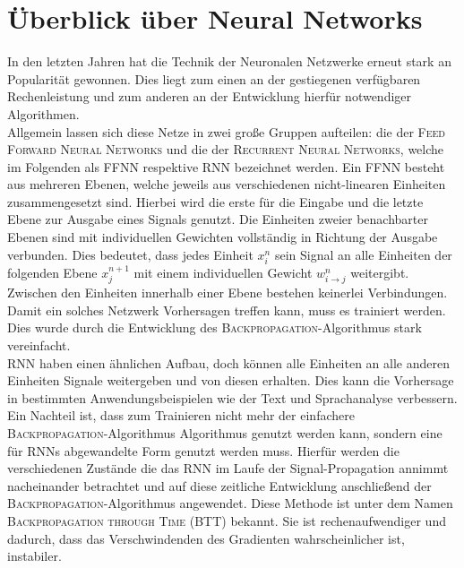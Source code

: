 \chapter{Überblick über Neural Networks}
In den letzten Jahren hat die Technik der Neuronalen Netzwerke erneut stark an Popularität gewonnen. Dies liegt zum einen an der gestiegenen verfügbaren Rechenleistung und zum anderen an der Entwicklung hierfür notwendiger Algorithmen.\\
Allgemein lassen sich diese Netze in zwei große Gruppen aufteilen: die der \textsc{Feed Forward Neural Networks} und die der \textsc{Recurrent Neural Networks}, welche im Folgenden als \textsc{FFNN} respektive \textsc{RNN} bezeichnet werden.
Ein \textsc{FFNN} besteht aus mehreren Ebenen, welche jeweils aus verschiedenen nicht-linearen Einheiten zusammengesetzt sind. Hierbei wird die erste für die Eingabe und die letzte Ebene zur Ausgabe eines Signals genutzt. Die Einheiten zweier benachbarter Ebenen sind mit individuellen Gewichten vollständig in Richtung der Ausgabe verbunden. Dies bedeutet, dass jedes Einheit $x^n_i$ sein Signal an alle Einheiten der folgenden Ebene $x^{n+1}_j$ mit einem individuellen Gewicht $w^n_{i \rightarrow j}$ weitergibt. Zwischen den Einheiten innerhalb einer Ebene bestehen keinerlei Verbindungen.
Damit ein solches Netzwerk Vorhersagen treffen kann, muss es trainiert werden. Dies wurde durch die Entwicklung des \textsc{Backpropagation}-Algorithmus stark vereinfacht.\\

\textsc{RNN} haben einen ähnlichen Aufbau, doch können alle Einheiten an alle anderen Einheiten Signale weitergeben und von diesen erhalten. Dies kann die Vorhersage in bestimmten Anwendungsbeispielen wie der Text und Sprachanalyse verbessern. Ein Nachteil ist, dass zum Trainieren nicht mehr der einfachere \textsc{Backpropagation}-Algorithmus Algorithmus genutzt werden kann, sondern eine für \textsc{RNN}s abgewandelte Form genutzt werden muss. Hierfür werden die verschiedenen Zustände die das \textsc{RNN} im Laufe der Signal-Propagation annimmt nacheinander betrachtet und auf diese zeitliche Entwicklung anschließend der \textsc{Backpropagation}-Algorithmus angewendet. Diese Methode ist unter dem Namen \textsc{Backpropagation through Time} (BTT) bekannt. Sie ist rechenaufwendiger und dadurch, dass das Verschwindenden des Gradienten wahrscheinlicher ist, instabiler.\\

